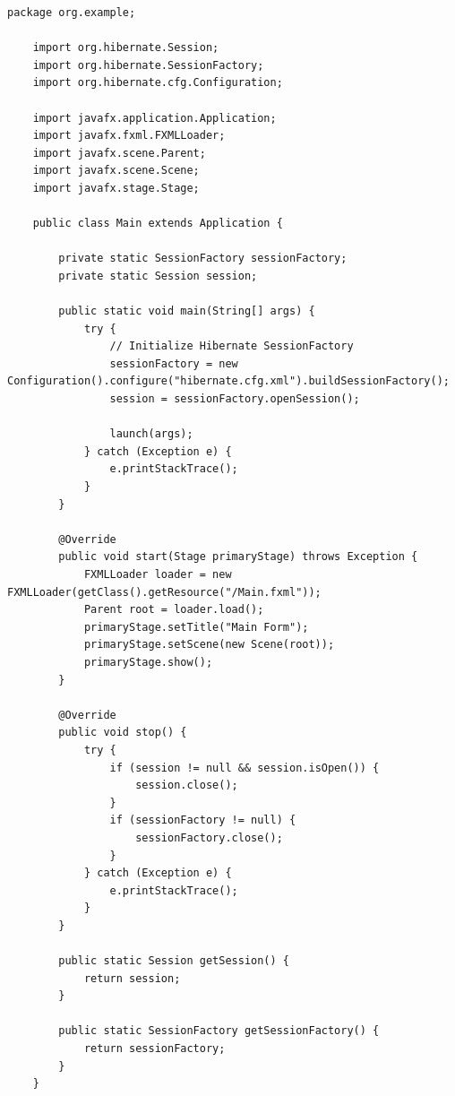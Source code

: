 \begin{lstlisting}[style=JavaStyle]
	package org.example;
	
	import org.hibernate.Session;
	import org.hibernate.SessionFactory;
	import org.hibernate.cfg.Configuration;
	
	import javafx.application.Application;
	import javafx.fxml.FXMLLoader;
	import javafx.scene.Parent;
	import javafx.scene.Scene;
	import javafx.stage.Stage;
	
	public class Main extends Application {
		
		private static SessionFactory sessionFactory;
		private static Session session;
		
		public static void main(String[] args) {
			try {
				// Initialize Hibernate SessionFactory
				sessionFactory = new Configuration().configure("hibernate.cfg.xml").buildSessionFactory();
				session = sessionFactory.openSession();
				
				launch(args);
			} catch (Exception e) {
				e.printStackTrace();
			}
		}
		
		@Override
		public void start(Stage primaryStage) throws Exception {
			FXMLLoader loader = new FXMLLoader(getClass().getResource("/Main.fxml"));
			Parent root = loader.load();
			primaryStage.setTitle("Main Form");
			primaryStage.setScene(new Scene(root));
			primaryStage.show();
		}
		
		@Override
		public void stop() {
			try {
				if (session != null && session.isOpen()) {
					session.close();
				}
				if (sessionFactory != null) {
					sessionFactory.close();
				}
			} catch (Exception e) {
				e.printStackTrace();
			}
		}
		
		public static Session getSession() {
			return session;
		}
		
		public static SessionFactory getSessionFactory() {
			return sessionFactory;
		}
	}
\end{lstlisting}

